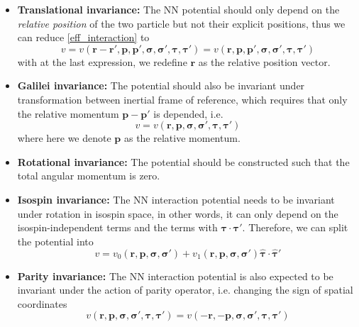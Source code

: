 \begin{itemize}
        \item \textbf{Translational invariance:} The \gls{NN} potential should only depend on the \emph{relative position} of the two particle but not their explicit positions, thus we can reduce \eqref{eff_interaction} to
                \begin{equation}
                        v = v(\bm{r}-\bm{r'},\bm{p},\bm{p'},\bm{\sigma},\bm{\sigma'},\bm{\tau},\bm{\tau'}) = v(\bm{r},\bm{p},\bm{p'},\bm{\sigma},\bm{\sigma'},\bm{\tau},\bm{\tau'})
                \end{equation}
                with at the last expression, we redefine $\bm{r}$ as the relative position vector.

        \item \textbf{Galilei invariance:} The potential should also be invariant under transformation between inertial frame of reference, which requires that only the relative momentum $\bm{p}-\bm{p'}$ is depended, i.e.
                \begin{equation}
                        v = v(\bm{r},\bm{p},\bm{\sigma},\bm{\sigma'},\bm{\tau},\bm{\tau'})
                        \label{eq2-3}
                \end{equation}
                where here we denote $\bm{p}$ as the relative momentum.

        \item \textbf{Rotational invariance:} The potential should be constructed such that the total angular momentum is zero.
                
        \item \textbf{Isospin invariance:} The \gls{NN} interaction potential needs to be invariant under rotation in isospin space, in other words, it can only depend on the isospin-independent terms and the terms with $\bm{\tau}\cdot\bm{\tau'}$. Therefore, we can split the potential into
                \begin{equation}
                        v = v_0 (\bm{r},\bm{p},\bm{\sigma},\bm{\sigma'}) + v_1 (\bm{r},\bm{p},\bm{\sigma},\bm{\sigma'}) \bm{\hat{\tau}}\cdot\bm{\hat{\tau}'}
                \end{equation}

        \item \textbf{Parity invariance:} The \gls{NN} interaction potential is also expected to be invariant under the action of parity operator, i.e. changing the sign of spatial coordinates
                \begin{equation}
                        v(\bm{r},\bm{p},\bm{\sigma},\bm{\sigma'},\bm{\tau},\bm{\tau'}) = v(-\bm{r},-\bm{p},\bm{\sigma},\bm{\sigma'},\bm{\tau},\bm{\tau'})
                \end{equation}


\end{itemize}
